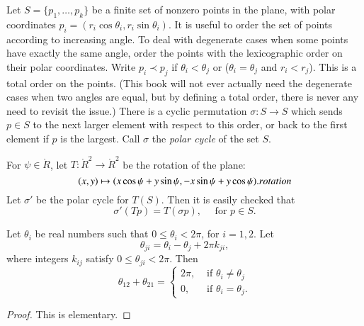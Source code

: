 Let $S=\{p_1,\ldots,p_k\}$ be a finite set of
nonzero points in the plane, with
polar coordinates $p_i = (r_i\cos\theta_i,r_i\sin\theta_i)$.
It is useful to order the set of points according to increasing angle.
To deal with degenerate cases when some points have exactly
the same angle, order the points with the lexicographic order on their
polar coordinates.  Write $p_i \prec p_j$ if
$\theta_i < \theta_j$ or ($\theta_i=\theta_j$ and $r_i<r_j$).
This is a total order on the points.  (This book will not ever
actually need the degenerate cases when two angles are equal,
but by defining a total order,  there is never any need to revisit the issue.)
%
There is a cyclic permutation $\sigma:S\to S$ which sends
$p\in S$ to the next larger element with respect to this order,
or back to the first element if $p$ is the largest.
Call $\sigma$ the {\it polar cycle}
of the set $S$.
%
%
%
%




For $\psi\in\ring{R}$, let $T:\ring{R}^2\to\ring{R}^2$ be the
rotation of the plane:
   \begin{equation}
   \label{eqn:rotate}
   (x,y) \mapsto  (x\cos\psi + y\sin\psi,-x\sin\psi+y\cos\psi).
   \indy{Index}{rotation}%
   \end{equation}
Let $\sigma'$ be the polar cycle for $T(S)$.  Then it is easily
checked that
$$
   \sigma'(T p) = T (\sigma p),\quad \text{ for } p\in S. 
$$
%
%

\begin{lemma}\label{lemma:polar2}
Let $\theta_i$ be real numbers such that $0\le \theta_i < 2\pi$, for $i=1,2$.
Let $$\theta_{ji} = \theta_i - \theta_j + 2\pi k_{ji},$$
where integers $k_{ij}$ satisfy $0\le \theta_{ji}< 2\pi$.
Then 
$$
  \theta_{12} + \theta_{21} = \begin{cases}
    2\pi, & \text{ if }\theta_i\ne\theta_j\\
    0,    & \text{ if }\theta_i=\theta_j.
    \end{cases}
$$
\end{lemma}
%

\begin{proof} This is elementary.
\end{proof}

